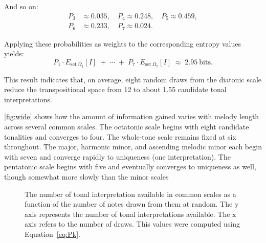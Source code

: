 \documentclass[10pt,twocolumn]{article}
\numberwithin{equation}{section} %
\begin{document}
    And so on:
    \begin{align*}
        P_3 &\approx 0.035, \quad
        P_4 \approx 0.248, \quad
        P_5 \approx 0.459, \\
        P_6 &\approx 0.233, \quad
        P_7 \approx 0.024.
    \end{align*}

    Applying these probabilities as weights to the corresponding entropy values yields:
    \[
        P_1 \cdot E_{\text{set}~\Omega_1}[I] \;+\; \cdots \;+\; P_7 \cdot E_{\text{set}~\Omega_7}[I]
        \;\approx\; 2.95 \ \text{bits}.
    \]

    This result indicates that, on average, eight random draws from the diatonic scale reduce the transpositional space from 12 to about 1.55 candidate tonal interpretations.

    \autoref{fig:wide} shows how the amount of information gained varies with melody length across several common scales.
    The octatonic scale begins with eight candidate tonalities and converges to four.
    The whole‑tone scale remains fixed at six throughout.
    The major, harmonic minor, and ascending melodic minor each begin with seven and converge rapidly to uniqueness (one interpretation).
    The pentatonic scale begins with five and eventually converges to uniqueness as well, though somewhat more slowly than the minor scales

    \begin{figure}[htbp]
        \centering
        \caption{The number of tonal interpretation available in common scales as a function of the number of notes drawn from them at random.
        The y axis represents the number of tonal interpretations available.
        The x axis refers to the number of draws.
        This values were computed using Equation~\ref{eq:Pk}.}
        \label{fig:wide}
    \end{figure}
\end{document}

